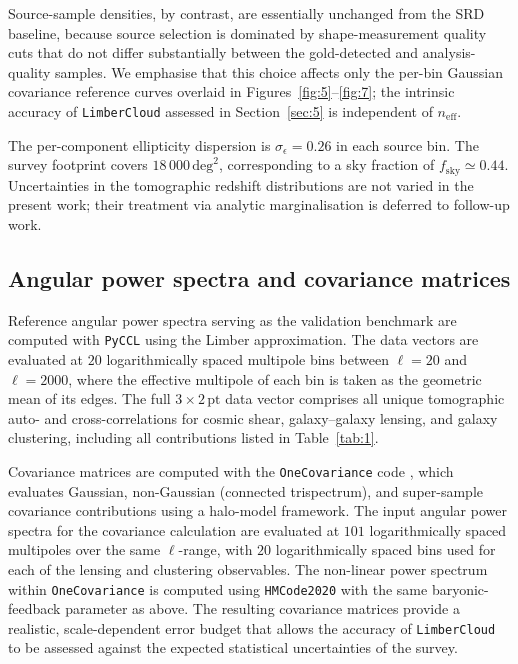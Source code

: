 Source-sample densities, by contrast, are essentially unchanged from the SRD baseline, because source selection is dominated by shape-measurement quality cuts that do not differ substantially between the gold-detected and analysis-quality samples. We emphasise that this choice affects only the per-bin Gaussian covariance reference curves overlaid in Figures~\ref{fig:5}--\ref{fig:7}; the intrinsic accuracy of \texttt{LimberCloud} assessed in Section~\ref{sec:5} is independent of \(n_{\mathrm{eff}}\).

The per-component ellipticity dispersion is \(\sigma_\epsilon = 0.26\) in each source bin. The survey footprint covers \(18\,000\,\mathrm{deg}^2\), corresponding to a sky fraction of \(f_{\mathrm{sky}} \simeq 0.44\). Uncertainties in the tomographic redshift distributions are not varied in the present work; their treatment via analytic marginalisation is deferred to follow-up work.

\subsection{Angular power spectra and covariance matrices} \label{sec:3.4}

Reference angular power spectra serving as the validation benchmark are computed with \texttt{PyCCL} using the Limber approximation. The data vectors are evaluated at \(20\) logarithmically spaced multipole bins between \(\ell = 20\) and \(\ell = 2000\), where the effective multipole of each bin is taken as the geometric mean of its edges. The full \(3 \times 2\,\mathrm{pt}\) data vector comprises all unique tomographic auto- and cross-correlations for cosmic shear, galaxy--galaxy lensing, and galaxy clustering, including all contributions listed in Table~\ref{tab:1}.

Covariance matrices are computed with the \texttt{OneCovariance} code \citep{2025A&A...699A.124R}, which evaluates Gaussian, non-Gaussian (connected trispectrum), and super-sample covariance contributions using a halo-model framework. The input angular power spectra for the covariance calculation are evaluated at \(101\) logarithmically spaced multipoles over the same \(\ell\)-range, with \(20\) logarithmically spaced bins used for each of the lensing and clustering observables. The non-linear power spectrum within \texttt{OneCovariance} is computed using \texttt{HMCode2020} with the same baryonic-feedback parameter as above. The resulting covariance matrices provide a realistic, scale-dependent error budget that allows the accuracy of \texttt{LimberCloud} to be assessed against the expected statistical uncertainties of the survey.
